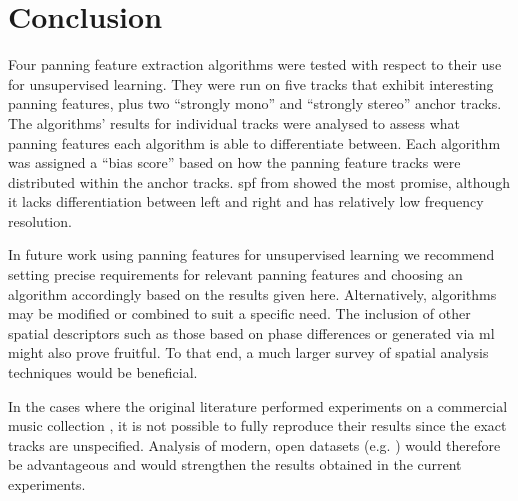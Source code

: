 \documentclass[twoside,a4paper]{article}
\begin{document}
\section{Conclusion}
\label{sec:conclusion}
Four panning feature extraction algorithms were tested with respect to their use for unsupervised learning. They were run on five tracks that exhibit interesting panning features, plus two \enquote{strongly mono} and \enquote{strongly stereo} anchor tracks. The algorithms' results for individual tracks were analysed to assess what panning features each algorithm is able to differentiate between. Each algorithm was assigned a \enquote{bias score} based on how the panning feature tracks were distributed within the anchor tracks. \gls{spf} from \cite{tzanetakisStereoPanningFeatures2007} showed the most promise, although it lacks differentiation between left and right and has relatively low frequency resolution.

In future work using panning features for unsupervised learning we recommend setting precise requirements for relevant panning features and choosing an algorithm accordingly based on the results given here. Alternatively, algorithms may be modified or combined to suit a specific need. The inclusion of other spatial descriptors such as those based on phase differences or generated via \gls{ml} might also prove fruitful. To that end, a much larger survey of spatial analysis techniques would be beneficial. 

In the cases where the original literature performed experiments on a commercial music collection \cite{tzanetakisStereoPanningFeatures2007,tardieuProductionEffectAudio2011}, it is not possible to fully reproduce their results since the exact tracks are unspecified. Analysis of modern, open datasets (e.g. \cite{bogdanovMTGJamendoDatasetAutomatic2019,fma_dataset}) would therefore be advantageous and would strengthen the results obtained in the current experiments.




\end{document}
